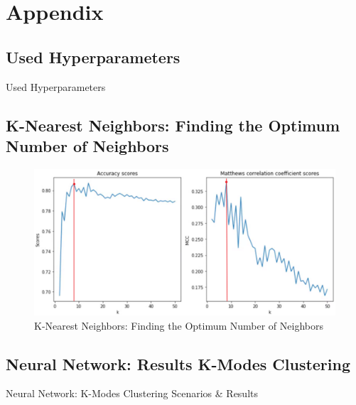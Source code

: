 \section{Appendix}

\subsection{Used Hyperparameters}
\label{ssec:ushp}
\begin{table}[h]
\begin{footnotesize}

\end{footnotesize}
\caption{\label{tab:Hyperparameters} Used Hyperparameters}
\end{table}

\subsection{K-Nearest Neighbors: Finding the Optimum Number of Neighbors}
\label{ssec:fonn}
\begin{figure}[h]
    \centering
    \includegraphics[width=.7\linewidth]{ThesisTemplate/Images/KNN_n_neighbors.png}
    \caption{K-Nearest Neighbors: Finding the Optimum Number of Neighbors}
\end{figure}

\subsection{Neural Network: Results K-Modes Clustering}
\label{ssec:cluscen}
\begin{table}[H]
\begin{footnotesize}

\end{footnotesize}
\caption{\label{tab:clusc} Neural Network: K-Modes Clustering Scenarios \& Results}
\end{table}

